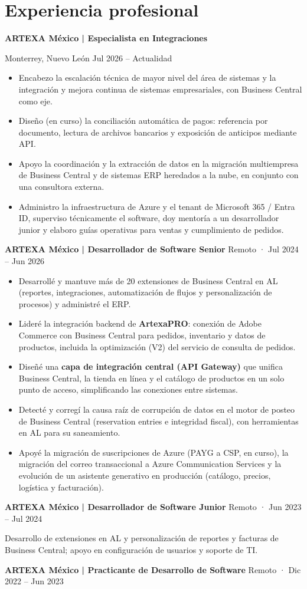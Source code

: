 \documentclass[10pt,letterpaper]{article}
\begin{document}
\section{Experiencia profesional}
\textbf{ARTEXA México | Especialista en Integraciones}\par
Monterrey, Nuevo León \hfill Jul 2026 -- Actualidad\par
\begin{itemize}
\item Encabezo la escalación técnica de mayor nivel del área de sistemas y la integración y mejora continua de sistemas empresariales, con Business Central como eje.
\item Diseño (en curso) la conciliación automática de pagos: referencia por documento, lectura de archivos bancarios y exposición de anticipos mediante API.
\item Apoyo la coordinación y la extracción de datos en la migración multiempresa de Business Central y de sistemas ERP heredados a la nube, en conjunto con una consultora externa.
\item Administro la infraestructura de Azure y el tenant de Microsoft 365 / Entra ID, superviso técnicamente el software, doy mentoría a un desarrollador junior y elaboro guías operativas para ventas y cumplimiento de pedidos.
\end{itemize}
\textbf{ARTEXA México | Desarrollador de Software Senior} \hfill Remoto · Jul 2024 -- Jun 2026
\begin{itemize}
\item Desarrollé y mantuve más de 20 extensiones de Business Central en AL (reportes, integraciones, automatización de flujos y personalización de procesos) y administré el ERP.
\item Lideré la integración backend de \textbf{ArtexaPRO}: conexión de Adobe Commerce con Business Central para pedidos, inventario y datos de productos, incluida la optimización (V2) del servicio de consulta de pedidos.
\item Diseñé una \textbf{capa de integración central (API Gateway)} que unifica Business Central, la tienda en línea y el catálogo de productos en un solo punto de acceso, simplificando las conexiones entre sistemas.
\item Detecté y corregí la causa raíz de corrupción de datos en el motor de posteo de Business Central (reservation entries e integridad fiscal), con herramientas en AL para su saneamiento.
\item Apoyé la migración de suscripciones de Azure (PAYG a CSP, en curso), la migración del correo transaccional a Azure Communication Services y la evolución de un asistente generativo en producción (catálogo, precios, logística y facturación).
\end{itemize}
\textbf{ARTEXA México | Desarrollador de Software Junior} \hfill Remoto · Jun 2023 -- Jul 2024\par
Desarrollo de extensiones en AL y personalización de reportes y facturas de Business Central; apoyo en configuración de usuarios y soporte de TI.
\par\textbf{ARTEXA México | Practicante de Desarrollo de Software} \hfill Remoto · Dic 2022 -- Jun 2023\par
\end{document}
